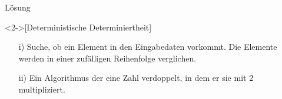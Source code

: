 \begin{frame}[c]{Lösung}
    \begin{solve}<2->[Deterministische Determiniertheit]
        \pause{}\begin{enumerate}[<+(1)->]
            \item[i)] Suche, ob ein Element in den Eingabedaten vorkommt.\pause{} Die Elemente werden in einer zufälligen Reihenfolge verglichen.
            \item[ii)] Ein Algorithmus der eine Zahl verdoppelt, in dem er sie mit \(2\) multipliziert.
        \end{enumerate}
    \end{solve}
\end{frame}
\fi
